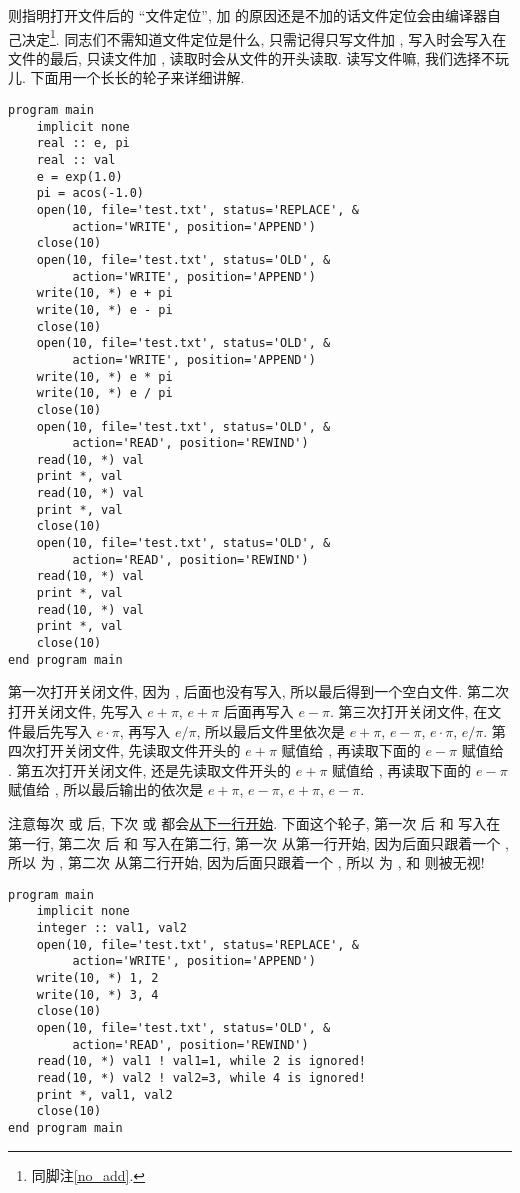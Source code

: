  则指明打开文件后的 ``文件定位'', 加  的原因还是不加的话文件定位会由编译器自己决定\footnote{同脚注\ref{no_add}.}. 同志们不需知道文件定位是什么, 只需记得只写文件加 , 写入时会写入在文件的最后, 只读文件加 , 读取时会从文件的开头读取. 读写文件嘛, 我们选择不玩儿. 下面用一个长长的轮子来详细讲解. 
\begin{lstlisting}
program main
    implicit none
    real :: e, pi
    real :: val
    e = exp(1.0)
    pi = acos(-1.0)
    open(10, file='test.txt', status='REPLACE', &
         action='WRITE', position='APPEND')
    close(10)
    open(10, file='test.txt', status='OLD', &
         action='WRITE', position='APPEND')
    write(10, *) e + pi
    write(10, *) e - pi
    close(10)
    open(10, file='test.txt', status='OLD', &
         action='WRITE', position='APPEND')
    write(10, *) e * pi
    write(10, *) e / pi
    close(10)
    open(10, file='test.txt', status='OLD', &
         action='READ', position='REWIND')
    read(10, *) val
    print *, val
    read(10, *) val
    print *, val
    close(10)
    open(10, file='test.txt', status='OLD', &
         action='READ', position='REWIND')
    read(10, *) val
    print *, val
    read(10, *) val
    print *, val
    close(10)
end program main
\end{lstlisting}
第一次打开关闭文件, 因为 , 后面也没有写入, 所以最后得到一个空白文件. 第二次打开关闭文件, 先写入 $ e+\pi $, $ e+\pi $ 后面再写入 $ e-\pi $. 第三次打开关闭文件, 在文件最后先写入 $ e\cdot\pi $, 再写入 $ e/\pi $, 所以最后文件里依次是 $ e+\pi $, $ e-\pi $, $ e\cdot\pi $, $ e/\pi $. 第四次打开关闭文件, 先读取文件开头的 $ e+\pi $ 赋值给 , 再读取下面的 $ e-\pi $ 赋值给 . 第五次打开关闭文件, 还是先读取文件开头的 $ e+\pi $ 赋值给 , 再读取下面的 $ e-\pi $ 赋值给 , 所以最后输出的依次是 $ e+\pi $, $ e-\pi $, $ e+\pi $, $ e-\pi $. 

注意每次  或  后, 下次  或  都会\uline{从下一行开始}. 下面这个轮子, 第一次  后  和  写入在第一行, 第二次  后  和  写入在第二行, 第一次  从第一行开始, 因为后面只跟着一个 , 所以  为 , 第二次  从第二行开始, 因为后面只跟着一个 , 所以  为 ,  和  则被无视!
\begin{lstlisting}
program main
    implicit none
    integer :: val1, val2
    open(10, file='test.txt', status='REPLACE', &
         action='WRITE', position='APPEND')
    write(10, *) 1, 2
    write(10, *) 3, 4
    close(10)
    open(10, file='test.txt', status='OLD', &
         action='READ', position='REWIND')
    read(10, *) val1 ! val1=1, while 2 is ignored!
    read(10, *) val2 ! val2=3, while 4 is ignored!
    print *, val1, val2
    close(10)
end program main
\end{lstlisting}

